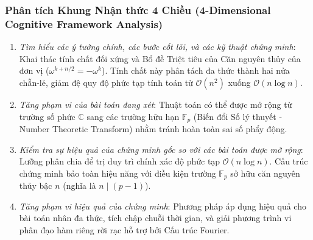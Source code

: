\documentclass{article}
\begin{document}
\subsubsection*{Phân tích Khung Nhận thức 4 Chiều (4-Dimensional Cognitive Framework Analysis)}
\begin{enumerate}
 \item \textit{Tìm hiểu các ý tưởng chính, các bước cốt lõi, và các kỹ thuật chứng minh}: Khai thác tính chất đối xứng và Bổ đề Triệt tiêu của Căn nguyên thủy của đơn vị ($\omega^{k+n/2} = -\omega^k$). Tính chất này phân tách đa thức thành hai nửa chẵn-lẻ, giảm đệ quy độ phức tạp tính toán từ $\mathcal{O}(n^2)$ xuống $\mathcal{O}(n \log n)$.
 \item \textit{Tăng phạm vi của bài toán đang xét}: Thuật toán có thể được mở rộng từ trường số phức $\mathbb{C}$ sang các trường hữu hạn $\mathbb{F}_p$ (Biến đổi Số lý thuyết - Number Theoretic Transform) nhằm tránh hoàn toàn sai số phẩy động.
 \item \textit{Kiểm tra sự hiệu quả của chứng minh gốc so với các bài toán được mở rộng}: Lưỡng phân chia để trị duy trì chính xác độ phức tạp $\mathcal{O}(n \log n)$. Cấu trúc chứng minh bảo toàn hiệu năng với điều kiện trường $\mathbb{F}_p$ sở hữu căn nguyên thủy bậc $n$ (nghĩa là $n \mid (p-1)$).
 \item \textit{Tăng phạm vi hiệu quả của chứng minh}: Phương pháp áp dụng hiệu quả cho bài toán nhân đa thức, tích chập chuỗi thời gian, và giải phương trình vi phân đạo hàm riêng rời rạc hỗ trợ bởi Cấu trúc Fourier.
\end{enumerate}

\end{document}
